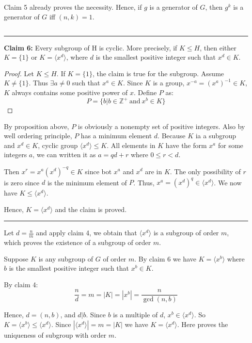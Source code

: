 \documentclass[12pt]{article}
\begin{document}
Claim 5 already proves the necessity. Hence, if $g$ is a generator of $G$, then $g^k$ is a generator of $G$ iff $(n,k)=1$.
\subsection{} %

\noindent\rule{\textwidth}{1pt}
\noindent\textbf{Claim 6: }Every subgroup of H is cyclic. More precisely, if $K\le H$, then either $K=\{1\}$ or $K =\langle x^d\rangle$, where $d$ is the smallest positive integer such that $x^d\in K$.
\begin{proof}
Let $K\le H$. If $K=\{1\}$, the claim is true for the subgroup. Assume $K\ne \{1\}$. Thus $\exists a\ne 0$ such that $x^a\in K$. Since $K$ is a group, $x^{-a}=(x^a)^{-1}\in K$, $K$ always contains some positive power of $x$. Define $P$ as:
$$P=\{b|b\in\mathbb{Z}^+\ \mathrm{and}\ x^b\in K\}$$
\end{proof}
By proposition above, $P$ is obviously a nonempty set of positive integers. Also by well ordering principle, $P$ has a minimum element $d$. Because $K$ ia a subgroup and $x^d\in K$, cyclic group $\langle x^d\rangle\le K$. All elements in $K$ have the form $x^a$ for some integers $a$, we can written it as $a=qd+r$ where $0\le r < d$.

Then $x^r=x^a(x^d)^{-q}\in K$ since bot $x^a$ and $x^d$ are in $K$. The only possibility of $r$ is zero since $d$ is the minimum element of $P$. Thus, $x^a=(x^d)^q\in \langle x^d\rangle$. We now have $K\le \langle x^d\rangle$.

Hence, $K=\langle x^d\rangle$ and the claim is proved.

\noindent\rule{\textwidth}{1pt}

Let $d=\frac{n}{m}$ and apply claim 4, we obtain that $\langle x^d\rangle$ is a subgroup of order $m$, which proves the existence of a subgroup of order $m$.

Suppose $K$ is any subgroup of $G$ of order $m$. By claim 6 we have $K=\langle x^b\rangle$ where $b$ is the smallest positive integer such that $x^b\in K$.

By claim 4:
$$\frac{n}{d}=m=|K|=|x^b|=\frac{n}{\gcd{(n,b)}}$$

Hence, $d=(n,b)$, and $d|b$. Since $b$ is a multiple of $d$, $x^b\in\langle x^d\rangle$. So $K=\langle x^b\rangle\le \langle x^d\rangle$.
Since $|\langle x^d\rangle|=m=|K|$ we have $K=\langle x^d\rangle$. Here proves the uniqueness of subgroup with order $m$.

\subsection{} %
\end{document}
